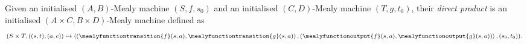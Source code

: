 \begin{definition}
    Given an initialised \((A,B)\)-Mealy machine \((S,f,s_0)\) and an
    initialised \((C,D)\)-Mealy machine \((T,g,t_0)\), their
    \emph{direct product} is an initialised \((A \times C,B \times D)\)-Mealy
    machine defined as \[
        (S \times T, \left((s, t), (a, c)\right) \mapsto \left\langle
        \left(
        \mealyfunctiontransition{f}\mleft(s, a\mright),
        \mealyfunctiontransition{g}\mleft(s, a\mright)
        \right),
        \left(
        \mealyfunctionoutput{f}\mleft(s, a\mright),
        \mealyfunctionoutput{g}\mleft(s, a\mright)
        \right)\right\rangle,
        (s_0, t_0)
        ).
    \]
\end{definition}

